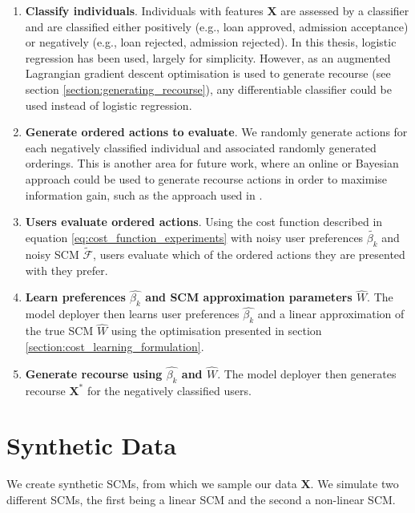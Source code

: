 \begin{enumerate}
	\item \textbf{Classify individuals}. Individuals with features $\mathbf{X}$ are assessed by a classifier and are classified either positively (e.g., loan approved, admission acceptance) or negatively (e.g., loan rejected, admission rejected). In this thesis, logistic regression has been used, largely for simplicity. However, as an augmented Lagrangian gradient descent optimisation is used to generate recourse (see section \ref{section:generating_recourse}), any differentiable classifier could be used instead of logistic regression.
	
	\item \textbf{Generate ordered actions to evaluate}. We randomly generate actions for each negatively classified individual and associated randomly generated orderings. This is another area for future work, where an online or Bayesian approach could be used to generate recourse actions in order to maximise information gain, such as the approach used in \textcite{detoniPersonalizedAlgorithmicRecourse2023}.
	
	\item \textbf{Users evaluate ordered actions}. Using the cost function described in equation \ref{eq:cost_function_experiments} with noisy user preferences $\tilde{\beta_k}$ and noisy SCM $\tilde{\mathcal{F}}$, users evaluate which of the ordered actions they are presented with they prefer. 
	
	\item \textbf{Learn preferences $\hat{\beta_k}$ and SCM approximation parameters $\hat{W}$}. The model deployer then learns user preferences $\hat{\beta_k}$ and a linear approximation of the true SCM $\hat{W}$ using the optimisation presented in section \ref{section:cost_learning_formulation}.
	
	\item \textbf{Generate recourse using $\hat{\beta_k}$ and $\hat{W}$}. The model deployer then generates recourse $\mathbf{X}^*$ for the negatively classified users.
	
\end{enumerate}
\bigskip


\section{Synthetic Data}

We create synthetic SCMs, from which we sample our data $\mathbf{X}$. We simulate two different SCMs, the first being a linear SCM and the second a non-linear SCM.

